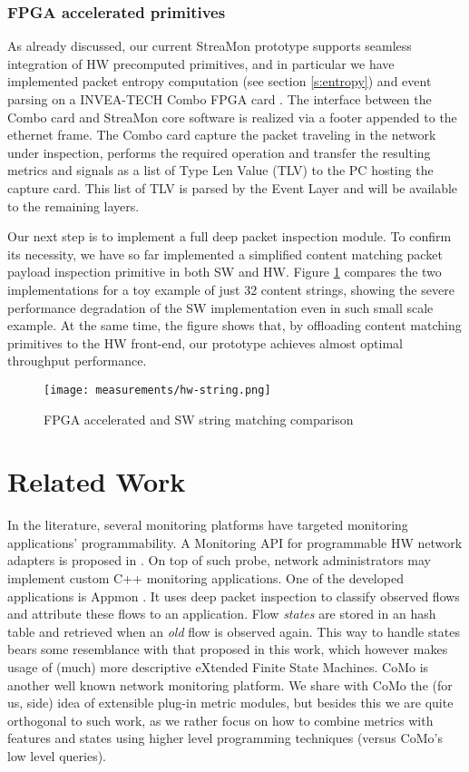 \documentclass[conference,letterpaper]{sig-alternate-10pt}
\begin{document}
\subsubsection{FPGA accelerated primitives}
\label{s:fpga}
As already discussed, our current StreaMon prototype supports seamless integration of HW precomputed 
primitives, and in particular we have implemented packet entropy computation (see section \ref{s:entropy}) and event parsing on a INVEA-TECH Combo FPGA card \cite{invea}. The interface between the Combo card and StreaMon core software is realized via a footer appended to the ethernet frame. The Combo card capture the packet traveling in the network under inspection, performs the required operation and transfer the resulting metrics and signals as a list of Type Len Value (TLV) to the PC hosting the capture card. This list of TLV is parsed by the Event Layer and will be available to the remaining layers. 

Our next step is to implement a full deep packet inspection module. To confirm its necessity, we have so far implemented a simplified content matching packet payload inspection primitive in both SW and HW. Figure \ref{fig:string_matching} compares the two implementations for a toy example of just 32 content strings, showing the severe performance degradation of the SW implementation even in such small scale example. At the same time,  
the figure shows that, by offloading content matching primitives to the HW front-end, our prototype achieves almost optimal throughput performance. 

\begin{figure}[!t]
\centering
\texttt{[image: measurements/hw-string.png]}
\caption{FPGA accelerated and SW string matching comparison}
\vspace*{-.5cm}
\label{fig:string_matching}
\end{figure}




\section{Related Work}
In the literature, several monitoring platforms have targeted monitoring applications' programmability. 
A Monitoring API for programmable HW network adapters is proposed in \cite{trimintzios06dimapi}. 
On top of such probe, network administrators may implement custom C++ monitoring applications. 
One of the developed applications is Appmon \cite{antoniades06appmon}. It uses deep packet 
inspection to classify observed flows and attribute these flows to an application. Flow \emph{states} 
are stored in an hash table and retrieved when an \emph{old} flow is observed again. This way to 
handle states bears some resemblance with that proposed in this work, which however makes usage 
of (much) more descriptive eXtended Finite State Machines. CoMo \cite{ian04} is another well known 
network monitoring platform. We share with CoMo the (for us, side) idea of extensible plug-in metric 
modules, but besides this we are quite orthogonal to such work, as we rather focus on how to combine 
metrics with features and states using higher level programming techniques (versus CoMo's low level queries). 
\end{document}
